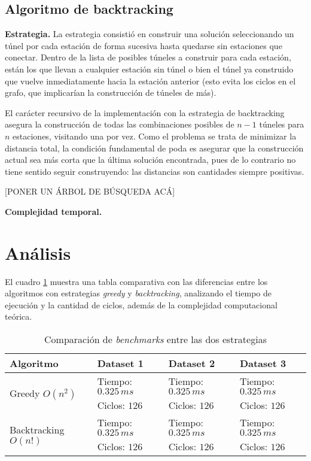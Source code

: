 \documentclass[10 pt, A4paper]{article}
\begin{document}
	\subsection*{Algoritmo de backtracking}

	\textbf{Estrategia.} La estrategia consistió en construir una solución seleccionando un túnel por cada estación de forma sucesiva hasta quedarse sin estaciones que conectar. Dentro de la lista de posibles túneles a construir para cada estación, están los que llevan a cualquier estación sin túnel o bien el túnel ya construido que vuelve inmediatamente hacia la estación anterior (esto evita los ciclos en el grafo, que implicarían la construcción de túneles de más). 
	
	El carácter recursivo de la implementación con la estrategia de backtracking asegura la construcción de todas las combinaciones posibles de $n-1$ túneles para $n$ estaciones, visitando una por vez. Como el problema se trata de minimizar la distancia total, la condición fundamental de poda es asegurar que la construcción actual sea más corta que la última solución encontrada, pues de lo contrario no tiene sentido seguir construyendo: las distancias son cantidades siempre positivas. 
	
	[PONER UN ÁRBOL DE BÚSQUEDA ACÁ]
	
	\textbf{Complejidad temporal.} 
	
	\section*{Análisis}
	El cuadro \ref{table} muestra una tabla comparativa con las diferencias entre los algoritmos con estrategias \textit{greedy} y \textit{backtracking}, analizando el tiempo de ejecución y la cantidad de ciclos, además de la complejidad computacional teórica.
	
	\begin{table}[h!]
		\centering
		\begin{tabular}{|p{4cm} | p{3cm} | p{3cm} | p{3cm}|}
			\hline
			Algoritmo & Dataset 1 & Dataset 2 & Dataset 3 \\
			\hline
			\multirow{2}{1em}{Greedy $O(n^2)$} & Tiempo: $0.325\,ms$ & Tiempo: $0.325\,ms$& Tiempo: $0.325\,ms$ \\ & Ciclos: $126$ & Ciclos: $126$ & Ciclos: $126$ \\
			\hline
			\multirow{2}{1em}{Backtracking $O(n!)$} & Tiempo: $0.325\,ms$& Tiempo: $0.325\,ms$& Tiempo: $0.325\,ms$\\ & Ciclos: $126$ & Ciclos: $126$ & Ciclos: $126$ \\
			\hline
		\end{tabular}
		\caption{Comparación de \textit{benchmarks} entre las dos estrategias}
		\label{table}
	\end{table}
	
\end{document}
